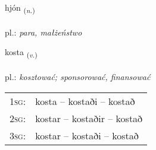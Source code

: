 \documentclass[frontgrid, backgrid]{flacards}\usepackage[]{graphicx}\usepackage[]{xcolor}
\begin{document}
\renewcommand{\flhead}{\vskip5pt \fboxsep=0pt {\small\bfseries\footnotesize Nafnorð | Noun}}
\renewcommand{\fcfoot}{\vskip5pt \fboxsep=0pt \hspace{2pt}{\small\bfseries\footnotesize 1K}}

\renewcommand{\blhead}{\vskip5pt {\small\bfseries\footnotesize Nafnorð | Noun }}
\renewcommand{\bcfoot}{\vskip5pt \hspace{2pt}{\small\bfseries\footnotesize 1K}}


{hjón \small{\textsubscript{(\textit{n.})}} \\[1ex] %
\textphonetic{[çouːn]} \\
pl.: \emph{para, małżeństwo} \\  [2ex]
\renewcommand*{\arraystretch}{0.8}
}

\renewcommand{\flhead}{\vskip5pt \fboxsep=0pt {\small\bfseries\footnotesize Sagnorð | Verb}}
\renewcommand{\fcfoot}{\vskip5pt \fboxsep=0pt \hspace{2pt}{\small\bfseries\footnotesize 1K}}

\renewcommand{\blhead}{\vskip5pt {\small\bfseries\footnotesize Sagnorð | Verb }}
\renewcommand{\bcfoot}{\vskip5pt \hspace{2pt}{\small\bfseries\footnotesize 1K}}


{kosta \small{\textsubscript{(\textit{v.})}} \\[1ex] %
\textphonetic{[kʰɔsta]} \\
pl.: \emph{kosztować; sponsorować, finansować} \\  [2ex]
\renewcommand*{\arraystretch}{0.8}
\begin{tabular}{p{1cm}l}
\textsc{1sg}: & kosta -- kostaði -- kostað \\ 
\textsc{2sg}: & kostar -- kostaðir -- kostað \\ 
\textsc{3sg}: & kostar -- kostaði -- kostað \\ 
\end{tabular}
}
\end{document}
